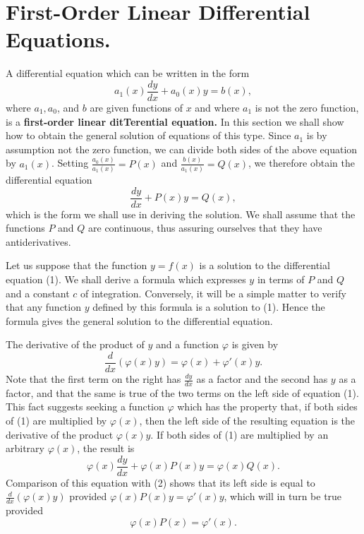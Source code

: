 \section{First-Order Linear Differential Equations.} A differential equation which can be written in the form
$$
a_1(x) \frac{dy}{dx} + a_0(x)y = b(x),
$$
where $a_1, a_0$, and $b$ are given functions of $x$ and where $a_1$ is not the zero function, is a \textbf{first-order linear ditTerential equation.} In this section we shall show
how to obtain the general solution of equations of this type. Since $a_1$ is by assumption not the zero function, we can divide both sides of the above equation by $a_1(x)$. Setting $\frac{a_0(x)}{a_1(x)} = P(x)$ and $\frac{b(x)}{a_1(x)} = Q(x)$, we therefore obtain the differential equation
\begin{equation}
\frac{dy}{dx} + P(x)y = Q(x),   
\label{eq11.2.1}
\end{equation}
which is the form we shall use in deriving the solution. We shall assume that the functions $P$ and $Q$ are continuous, thus assuring ourselves that they have antiderivatives.

Let us suppose that the function $y = f(x)$ is a solution to the differential equation (1). We shall derive a formula which expresses $y$ in terms of $P$ and $Q$ and a constant $c$ of integration. Conversely, it will be a simple matter to verify that any function $y$ defined by this formula is a solution to (1). Hence the formula gives the general solution to the differential equation.

The derivative of the product of $y$ and a function $\varphi$ is given by
\begin{equation}
\frac{d}{dx} (\varphi(x)y) = \varphi(x) + \varphi'(x)y. 
\label{eq11.2.2}
\end{equation}
Note that the first term on the right has $\frac{dy}{dx}$ as a factor and the second has $y$ as a factor, and that the same is true of the two terms on the left side of equation (1). This fact suggests seeking a function $\varphi$ which has the property that, if both sides of (1) are multiplied by $\varphi(x)$, then the left side of the resulting equation is the derivative of the product $\varphi(x)y$. If both sides of (1) are multiplied by an arbitrary $\varphi(x)$, the result is
\begin{equation}
\varphi(x) \frac{dy}{dx} + \varphi(x)P(x)y = \varphi(x)Q(x) . 
\label{eq11.2.3}
\end{equation}
Comparison of this equation with (2) shows that its left side is equal to $\frac{d}{dx} (\varphi(x)y)$ provided $\varphi(x)P(x)y = \varphi'(x)y$, which will in turn be true provided
\begin{equation}
\varphi(x)P(x) = \varphi'(x).  
\label{eq11.2.4}
\end{equation}


